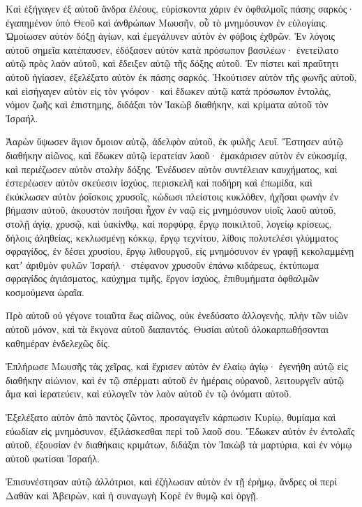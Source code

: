 {Καὶ ἐξήγαγεν ἐξ αὐτοῦ ἄνδρα ἐλέους, εὑρίσκοντα χάριν ἐν ὀφθαλμοῖς πάσης σαρκός· ἐγαπημένον ὑπὸ Θεοῦ καὶ ἀνθρώπων Μωυσῆν, οὗ τὸ μνημόσυνον ἐν εὐλογίαις.
Ὡμοίωσεν αὐτὸν δόξῃ ἁγίων, καὶ ἐμεγάλυνεν αὐτὸν ἐν φόβοις ἐχθρῶν.
Ἐν λόγοις αὐτοῦ σημεῖα κατέπαυσεν, ἐδόξασεν αὐτὸν κατὰ πρόσωπον βασιλέων· ἐνετείλατο αὐτῷ πρὸς λαὸν αὐτοῦ, καὶ ἔδειξεν αὐτῷ τῆς δόξης αὐτοῦ.
Ἐν πίστει καὶ πραΰτητι αὐτοῦ ἡγίασεν, ἐξελέξατο αὐτὸν ἐκ πάσης σαρκός.
Ἠκούτισεν αὐτὸν τῆς φωνῆς αὐτοῦ, καὶ εἰσήγαγεν αὐτὸν εἰς τὸν γνόφον· καὶ ἔδωκεν αὐτῷ κατὰ πρόσωπον ἐντολὰς, νόμον ζωῆς καὶ ἐπιστημης, διδάξαι τὸν Ἰακὼβ διαθήκην, καὶ κρίματα αὐτοῦ τὸν Ἰσραήλ.
\par }{\PP {}Ἀαρὼν ὕψωσεν ἅγιον ὅμοιον αὐτῷ, ἀδελφὸν αὐτοῦ, ἐκ φυλῆς Λευΐ.
Ἔστησεν αὐτῷ διαθήκην αἰῶνος, καὶ ἔδωκεν αὐτῷ ἱερατείαν λαοῦ· ἐμακάρισεν αὐτὸν ἐν εὐκοσμίᾳ, καὶ περιέζωσεν αὐτὸν στολὴν δόξης.
Ἐνέδυσεν αὐτὸν συντέλειαν καυχήματος, καὶ ἐστερέωσεν αὐτὸν σκεύεσιν ἰσχύος, περισκελῆ καὶ ποδήρη καὶ ἐπωμίδα,
καὶ ἐκύκλωσεν αὐτὸν ῥοΐσκοις χρυσοῖς, κώδωσι πλείστοις κυκλόθεν, ἠχῆσαι φωνὴν ἐν βήμασιν αὐτοῦ, ἀκουστὸν ποιῆσαι ἦχον ἐν ναῷ εἰς μνημόσυνον υἱοῖς λαοῦ αὐτοῦ,
στολῇ ἁγίᾳ, χρυσῷ, καὶ ὑακίνθῳ, καὶ πορφύρᾳ, ἔργῳ ποικιλτοῦ, λογείῳ κρίσεως, δήλοις ἀληθείας,
κεκλωσμένῃ κόκκῳ, ἔργῳ τεχνίτου, λίθοις πολυτελέσι γλύμματος σφραγίδος, ἐν δέσει χρυσίου, ἔργῳ λιθουργοῦ, εἰς μνημόσυνον ἐν γραφῇ κεκολαμμένῃ κατʼ ἀριθμὸν φυλῶν Ἰσραήλ·
στέφανον χρυσοῦν ἐπάνω κιδάρεως, ἐκτύπωμα σφραγίδος ἁγιάσματος, καύχημα τιμῆς, ἔργον ἰσχύος, ἐπιθυμήματα ὀφθαλμῶν κοσμούμενα ὡραῖα.
\par }{\PP {}Πρὸ αὐτοῦ οὐ γέγονε τοιαῦτα ἕως αἰῶνος, οὐκ ἐνεδύσατο ἀλλογενὴς, πλὴν τῶν υἱῶν αὐτοῦ μόνον, καὶ τὰ ἔκγονα αὐτοῦ διαπαντός.
Θυσίαι αὐτοῦ ὁλοκαρπωθήσονται καθημέραν ἐνδελεχῶς δίς.
\par }{\PP {}Ἐπλήρωσε Μωυσῆς τὰς χεῖρας, καὶ ἔχρισεν αὐτὸν ἐν ἐλαίῳ ἁγίῳ· ἐγενήθη αὐτῷ εἰς διαθήκην αἰώνιον, καὶ ἐν τῷ σπέρματι αὐτοῦ ἐν ἡμέραις οὐρανοῦ, λειτουργεῖν αὐτῷ ἅμα καὶ ἱερατεύειν, καὶ εὐλογεῖν τὸν λαὸν αὐτοῦ ἐν τῷ ὀνόματι αὐτοῦ.
\par }{\PP {}Ἐξελέξατο αὐτὸν ἀπὸ παντὸς ζῶντος, προσαγαγεῖν κάρπωσιν Κυρίῳ, θυμίαμα καὶ εὐωδίαν εἰς μνημόσυνον, ἐξιλάσκεσθαι περὶ τοῦ λαοῦ σου.
Ἔδωκεν αὐτὸν ἐν ἐντολαῖς αὐτοῦ, ἐξουσίαν ἐν διαθήκαις κριμάτων, διδάξαι τὸν Ἰακὼβ τὰ μαρτύρια, καὶ ἐν νόμῳ αὐτοῦ φωτίσαι Ἰσραήλ.
\par }{\PP {}Ἐπισυνέστησαν αὐτῷ ἀλλότριοι, καὶ ἐζήλωσαν αὐτὸν ἐν τῇ ἐρήμῳ, ἄνδρες οἱ περὶ Δαθὰν καὶ Ἀβειρὼν, καὶ ἡ συναγωγὴ Κορὲ ἐν θυμῷ καὶ ὀργῇ.
}
